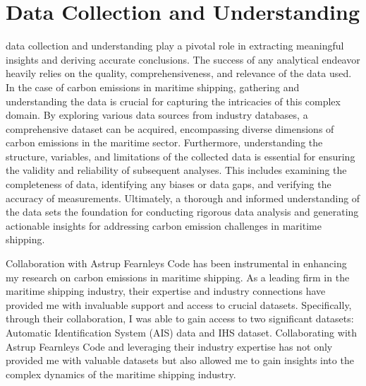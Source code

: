 \chapter{Data Collection and Understanding}

data collection and understanding play a pivotal role in extracting meaningful insights and deriving accurate conclusions.
The success of any analytical endeavor heavily relies on the quality, comprehensiveness, and relevance of the data used.
In the case of carbon emissions in maritime shipping, gathering and understanding the data is crucial for capturing the intricacies of this complex domain.
By exploring various data sources from industry databases, a comprehensive dataset can be acquired, encompassing diverse dimensions of carbon emissions in the maritime sector.
Furthermore, understanding the structure, variables, and limitations of the collected data is essential for ensuring the validity and reliability of subsequent analyses.
This includes examining the completeness of data, identifying any biases or data gaps, and verifying the accuracy of measurements.
Ultimately, a thorough and informed understanding of the data sets the foundation for conducting rigorous data analysis and generating actionable insights for addressing carbon emission challenges in maritime shipping.

Collaboration with Astrup Fearnleys Code has been instrumental in enhancing my research on carbon emissions in maritime shipping.
As a leading firm in the maritime shipping industry, their expertise and industry connections have provided me with invaluable support and access to crucial datasets.
Specifically, through their collaboration, I was able to gain access to two significant datasets: Automatic Identification System (AIS) data and IHS dataset.
Collaborating with Astrup Fearnleys Code and leveraging their industry expertise has not only provided me with valuable datasets but also allowed me to gain insights into the complex dynamics of the maritime shipping industry.

\newpage



\newpage



